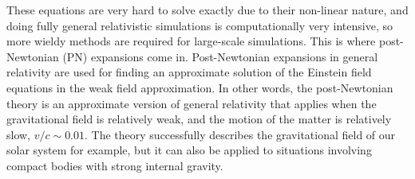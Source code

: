 \documentclass[english, oneside]{HYgradu}
\begin{document}
These equations are very hard to solve exactly due to their non-linear nature, and doing fully general relativistic simulations is computationally very intensive, so more wieldy methods are required for large-scale simulations. This is where post-Newtonian (PN) expansions come in. Post-Newtonian expansions in general relativity are used for finding an approximate solution of the Einstein field equations in the weak field approximation.
In other words, the post-Newtonian theory is an approximate version of general relativity that applies when the gravitational field is relatively weak, and the motion of the matter is relatively slow, $v/c \sim 0.01$. The theory successfully describes the gravitational field of our solar system for example, but it can also be applied to situations involving compact bodies with strong internal gravity.
%
%
\end{document}
